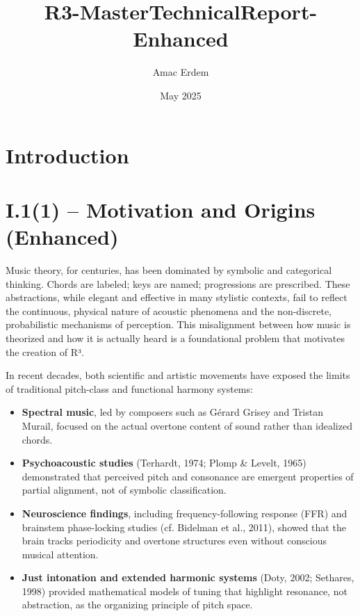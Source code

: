 \title{R3-MasterTechnicalReport-Enhanced}
\author{Amac Erdem}
\date{May 2025}

\maketitle

\section{Introduction}
\section*{I.1(1) – Motivation and Origins (Enhanced)}

Music theory, for centuries, has been dominated by symbolic and categorical thinking. Chords are labeled; keys are named; progressions are prescribed. These abstractions, while elegant and effective in many stylistic contexts, fail to reflect the continuous, physical nature of acoustic phenomena and the non-discrete, probabilistic mechanisms of perception. This misalignment between how music is theorized and how it is actually heard is a foundational problem that motivates the creation of R³.

In recent decades, both scientific and artistic movements have exposed the limits of traditional pitch-class and functional harmony systems:

\begin{itemize}
    \item \textbf{Spectral music}, led by composers such as Gérard Grisey and Tristan Murail, focused on the actual overtone content of sound rather than idealized chords.
    \item \textbf{Psychoacoustic studies} (Terhardt, 1974; Plomp \& Levelt, 1965) demonstrated that perceived pitch and consonance are emergent properties of partial alignment, not of symbolic classification.
    \item \textbf{Neuroscience findings}, including frequency-following response (FFR) and brainstem phase-locking studies (cf. Bidelman et al., 2011), showed that the brain tracks periodicity and overtone structures even without conscious musical attention.
    \item \textbf{Just intonation and extended harmonic systems} (Doty, 2002; Sethares, 1998) provided mathematical models of tuning that highlight resonance, not abstraction, as the organizing principle of pitch space.
\end{itemize}

